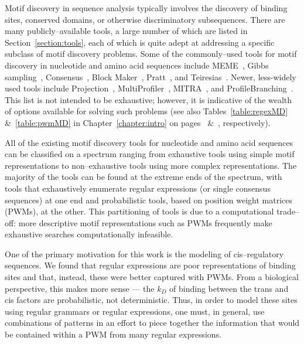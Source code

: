 Motif discovery in sequence analysis typically involves the
discovery of binding sites, conserved domains, or otherwise
discriminatory subsequences. There are many publicly--available
tools, a large number of which are listed in
Section~\vref{section:tools}, each of which is quite adept at
addressing a specific subclass of motif discovery problems. Some of
the commonly--used tools for motif discovery in nucleotide and amino
acid sequences include MEME~\citep{bailey1994fitting}, Gibbs
sampling~\citep{lawrence1993detecting},
Consensus~\citep{hertz1999identifying}, Block
Maker~\citep{henikoff1995automated},
Pratt~\citep{jonassen1995finding}, and
Teiresias~\citep{rigoutsos1998combinatorial}. Newer, less-widely
used tools include Projection~\citep{buhler2001finding},
MultiProfiler~\citep{keich2002finding},
MITRA~\citep{eskin2002finding}, and
ProfileBranching~\citep{price2003finding}.  This list is not
intended to be exhaustive; however, it is indicative of the wealth
of options available for solving such problems (see also
Tables~\ref{table:regexMD} \&~\ref{table:pwmMD} in Chapter~\ref{chapter:intro} on pages~\pageref{table:regexMD} \&~\pageref{table:pwmMD}, respectively).

All of the existing motif discovery tools for nucleotide and amino
acid sequences can be classified on a spectrum ranging from
exhaustive tools using simple motif representations to
non--exhaustive tools using more complex representations.  The
majority of the tools can be found at the extreme ends of the
spectrum, with tools that exhaustively enumerate regular expressions
(or single consensus sequences) at one end and probabilistic tools,
based on position weight matrices (PWMs), at the other. This
partitioning of tools is due to a computational trade--off: more
descriptive motif representations such as PWMs frequently make
exhaustive searches computationally infeasible.


One of the primary motivation for this work is the modeling of
cis--regulatory sequences. We found that regular expressions are
poor representations of binding sites and that, instead, these were
better captured with PWMs.  From a biological perspective, this
makes more sense --- the $k_D$ of binding between the trans and cis
factors are probabilistic, not deterministic.  Thus, in order to
model these sites using regular grammars or regular expressions, one
must, in general, use combinations of patterns in an effort to piece
together the information that would be contained within a PWM from
many regular expressions.


